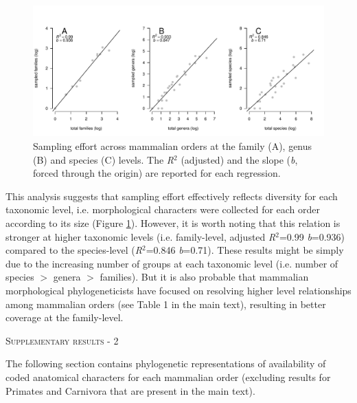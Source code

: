 \documentclass[12pt,letterpaper]{article}
\renewcommand{\section}[1]{%
\bigskip
\begin{center}
\begin{Large}
\normalfont\scshape #1
\medskip
\end{Large}
\end{center}}
\begin{document}
\begin{figure}[!htbp]
\centering
    \includegraphics[width=1\textwidth]{Supp_figure_sampling_effort.pdf}
\caption{Sampling effort across mammalian orders at the family (A), genus (B) and species (C) levels. The \textit{R$^2$} (adjusted) and the slope (\textit{b}, forced through the origin) are reported for each regression.}
\label{Supp_Figure_sampling}
\end{figure}

This analysis suggests that sampling effort effectively reflects diversity for each taxonomic level, i.e. morphological characters were collected for each order according to its size (Figure \ref{Supp_Figure_sampling}).
However, it is worth noting that this relation is stronger at higher taxonomic levels (i.e. family-level, adjusted \textit{R$^2$}=0.99 \textit{b}=0.936) compared to the species-level (\textit{R$^2$}=0.846 \textit{b}=0.71).
These results might be simply due to the increasing number of groups at each taxonomic level (i.e. number of species $>$ genera $>$ families).
But it is also probable that mammalian morphological phylogeneticists have focused on resolving higher level relationships among mammalian orders (see Table 1 in the main text), resulting in better coverage at the family-level.




\newpage

\section{Supplementary results - 2}
The following section contains phylogenetic representations of availability of coded anatomical characters for each mammalian order (excluding results for Primates and Carnivora that are present in the main text).
\end{document}
